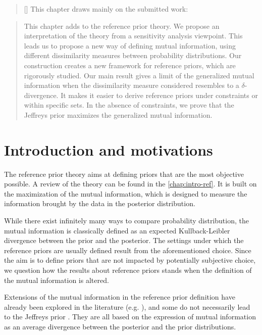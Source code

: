 
\begin{abstract}[\hspace*{-10pt}]
    This chapter draws mainly on the submitted work:   %
\end{abstract}

\begin{abstract}
    This chapter adds to the reference prior theory. We propose an interpretation of the theory from a sensitivity analysis viewpoint. This leads us to propose a new way of defining mutual information, using different dissimilarity measures between probability distributions. 
    Our construction  creates a new framework for reference priors, which are rigorously studied.
    Our main result gives a limit of the generalized mutual information when the dissimilarity measure considered resembles to a $\delta$-divergence.
    It makes it easier to derive reference priors under constraints or within specific sets. In the absence of constraints, we prove that the Jeffreys prior maximizes the generalized mutual information.
\end{abstract}

\minitoc

\section{Introduction and motivations}

The reference prior theory aims at defining priors that are the most objective possible. A review of the theory can be found in the \cref{chap:intro-ref}. It is built on the maximization of the mutual information, which is designed to measure the information brought by the data in the posterior distribution.

While there exist infinitely many ways to compare probability distribution, the mutual information is classically defined as an expected Kullback-Leibler divergence between the prior and the posterior.
The settings under which the reference priors are usually defined result from the aforementioned choice. Since the aim is to define priors that are not impacted by potentially subjective choice, we question how the results about reference priors stands when the definition of the mutual information is altered.

Extensions of the mutual information in the reference prior definition have already been explored in the literature (e.g. \cite{chen_objective_2010,liu_divergence_2014,le_formal_2014}), and some do not necessarily lead to the Jeffreys prior \citep{hashimoto_reference_2021,clarke_reference_1997,ghosh_general_2011}. They are all based on the expression of mutual information as an average divergence between the posterior and the prior distributions.




